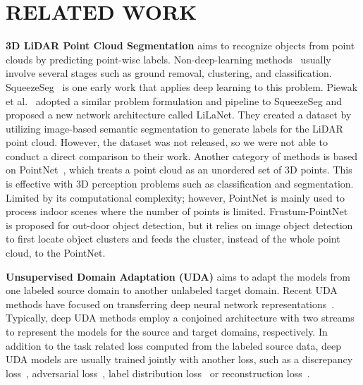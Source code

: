 \documentclass[letterpaper, 10 pt, conference]{ieeeconf}
\begin{document}
\section{RELATED WORK}
\label{sec:RelatedWork}
\textbf{3D LiDAR Point Cloud Segmentation} aims to recognize objects from point clouds by predicting point-wise labels. Non-deep-learning methods~\cite{moosmann2009segmentation, douillard2011segmentation, zermas2017fast} usually involve several stages such as ground removal, clustering, and classification. SqueezeSeg~\cite{wu2017squeezeseg} is one early work that applies deep learning to this problem. Piewak et al.~\cite{piewak2018boosting} adopted a similar problem formulation and pipeline to SqueezeSeg and proposed a new network architecture called LiLaNet. They created a dataset by utilizing image-based semantic segmentation to generate labels for the LiDAR point cloud. However, the dataset was not released, so we were not able to conduct a direct comparison to their work. Another category of methods is based on PointNet~\cite{qi2017pointnet, qi2017pointnet++}, which treats a point cloud as an unordered set of 3D points. This is effective with 3D perception problems such as classification and segmentation. Limited by its computational complexity; however, PointNet is mainly used to process indoor scenes where the number of points is limited. Frustum-PointNet~\cite{qi2017frustum} is proposed for out-door object detection, but it relies on image object detection to first locate object clusters and feeds the cluster, instead of the whole point cloud, to the PointNet.

\textbf{Unsupervised Domain Adaptation (UDA)} aims to adapt the models from one labeled source domain to another unlabeled target domain. Recent UDA methods have focused on transferring deep neural network representations~\cite{patel2015visual,csurka2017domain}. Typically, deep UDA methods employ a conjoined architecture with two streams to represent the models for the source and target domains, respectively. In addition to the task related loss computed from the labeled source data, deep UDA models are usually trained jointly with another loss, such as a discrepancy loss~\cite{long2015learning,sun2017correlation,zhuo2017deep,zhang2017curriculum,morerio2018minimal}, adversarial loss~\cite{liu2016coupled,ganin2016domain,tzeng2017adversarial,shrivastava2017learning,bousmalis2017unsupervised,hoffman2018cycada}, label distribution loss~\cite{zhang2017curriculum} or reconstruction loss~\cite{ghifary2015domain,ghifary2016deep}.
\end{document}
